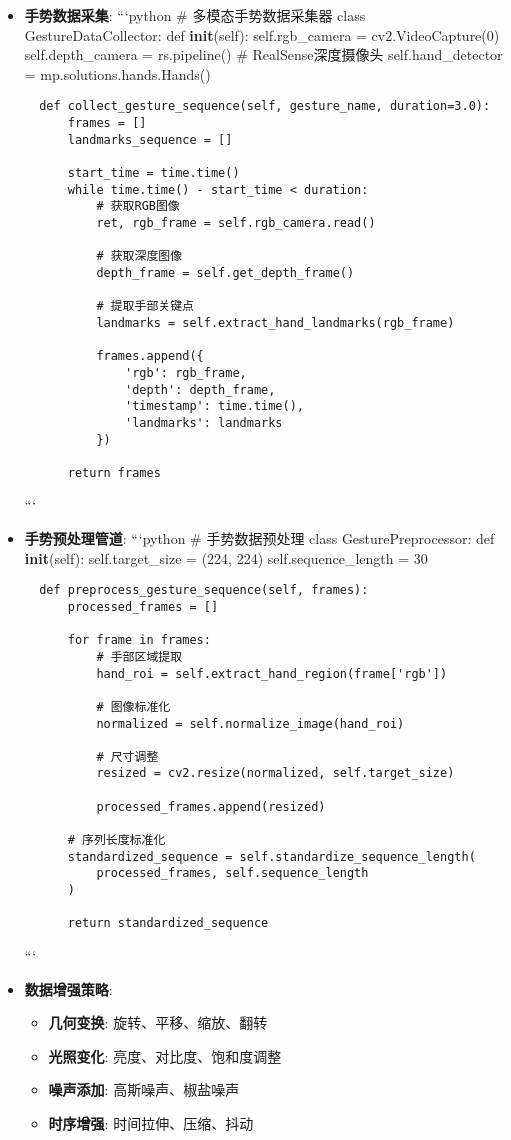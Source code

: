 \begin{itemize}
\item
  \textbf{手势数据采集}: ```python \# 多模态手势数据采集器 class
  GestureDataCollector: def \textbf{init}(self): self.rgb\_camera =
  cv2.VideoCapture(0) self.depth\_camera = rs.pipeline() \#
  RealSense深度摄像头 self.hand\_detector = mp.solutions.hands.Hands()

\begin{lstlisting}
  def collect_gesture_sequence(self, gesture_name, duration=3.0):
      frames = []
      landmarks_sequence = []

      start_time = time.time()
      while time.time() - start_time < duration:
          # 获取RGB图像
          ret, rgb_frame = self.rgb_camera.read()

          # 获取深度图像
          depth_frame = self.get_depth_frame()

          # 提取手部关键点
          landmarks = self.extract_hand_landmarks(rgb_frame)

          frames.append({
              'rgb': rgb_frame,
              'depth': depth_frame,
              'timestamp': time.time(),
              'landmarks': landmarks
          })

      return frames
\end{lstlisting}

  ```
\item
  \textbf{手势预处理管道}: ```python \# 手势数据预处理 class
  GesturePreprocessor: def \textbf{init}(self): self.target\_size =
  (224, 224) self.sequence\_length = 30

\begin{lstlisting}
  def preprocess_gesture_sequence(self, frames):
      processed_frames = []

      for frame in frames:
          # 手部区域提取
          hand_roi = self.extract_hand_region(frame['rgb'])

          # 图像标准化
          normalized = self.normalize_image(hand_roi)

          # 尺寸调整
          resized = cv2.resize(normalized, self.target_size)

          processed_frames.append(resized)

      # 序列长度标准化
      standardized_sequence = self.standardize_sequence_length(
          processed_frames, self.sequence_length
      )

      return standardized_sequence
\end{lstlisting}

  ```
\item
  \textbf{数据增强策略}:

  \begin{itemize}
  \tightlist
  \item
    \textbf{几何变换}: 旋转、平移、缩放、翻转
  \item
    \textbf{光照变化}: 亮度、对比度、饱和度调整
  \item
    \textbf{噪声添加}: 高斯噪声、椒盐噪声
  \item
    \textbf{时序增强}: 时间拉伸、压缩、抖动
  \end{itemize}
\end{itemize}

